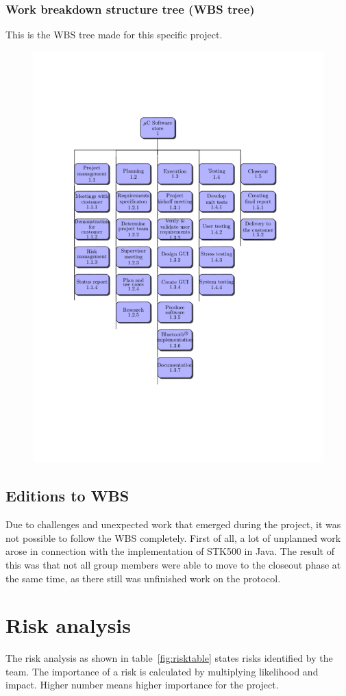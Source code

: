 \subsubsection{Work breakdown structure tree (WBS tree)}
This is the WBS tree made for this specific project.
\begin{figure}[H]
\vspace*{-1.5in}
\hspace*{-1.2in}
\includegraphics[trim=0cm 4cm 0cm 0cm]{figures/wbs-tree2.pdf}
\end{figure}

\subsection{Editions to WBS}
Due to challenges and unexpected work that emerged during the project, it was not possible to follow the WBS completely. First of all, a lot of unplanned work arose in connection with the implementation of STK500 in Java. The result of this was that not all group members were able to move to the closeout phase at the same time, as there still was unfinished work on the protocol.

\section{Risk analysis}
The risk analysis as shown in table~\ref{fig:risktable} states risks identified by the team. The importance of a risk is calculated by multiplying likelihood and impact. Higher number means higher importance for the project.

